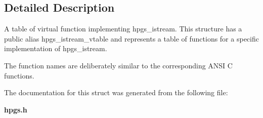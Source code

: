 \subsection{Detailed Description}
A table of virtual function implementing {\ttfamily hpgs\_\-istream}. This structure has a public alias {\ttfamily hpgs\_\-istream\_\-vtable} and represents a table of functions for a specific implementation of {\ttfamily hpgs\_\-istream}.

The function names are deliberately similar to the corresponding ANSI C functions. 

The documentation for this struct was generated from the following file:\begin{DoxyCompactItemize}
\item 
{\bf hpgs.h}\end{DoxyCompactItemize}
